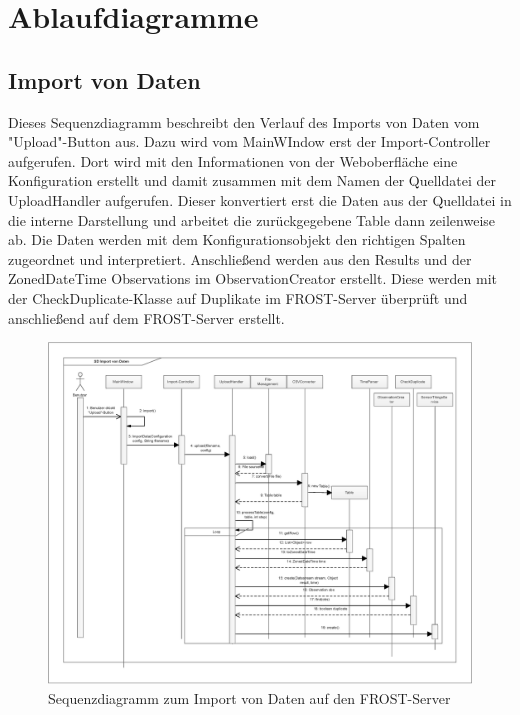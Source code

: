 \section{Ablaufdiagramme}

\subsection{Import von Daten}

Dieses Sequenzdiagramm beschreibt den Verlauf des Imports von Daten vom "{Upload}"{-Button} aus.
Dazu wird vom MainWIndow erst der Import-Controller aufgerufen.
Dort wird mit den Informationen von der Weboberfläche eine Konfiguration erstellt und damit zusammen mit dem Namen der Quelldatei der UploadHandler aufgerufen.
Dieser konvertiert erst die Daten aus der Quelldatei in die interne Darstellung und arbeitet die zurückgegebene Table dann zeilenweise ab.
Die Daten werden mit dem Konfigurationsobjekt den richtigen Spalten zugeordnet und interpretiert.
Anschließend werden aus den Results und der ZonedDateTime Observations im ObservationCreator erstellt.
Diese werden mit der CheckDuplicate-Klasse auf Duplikate im FROST-Server überprüft und anschließend auf dem FROST-Server erstellt.

\begin{figure}[htbp]
\centering
\includegraphics[scale=0.44]{uml/SD_upload.eps}
\caption{Sequenzdiagramm zum Import von Daten auf den FROST-Server}
\end{figure}

\clearpage
